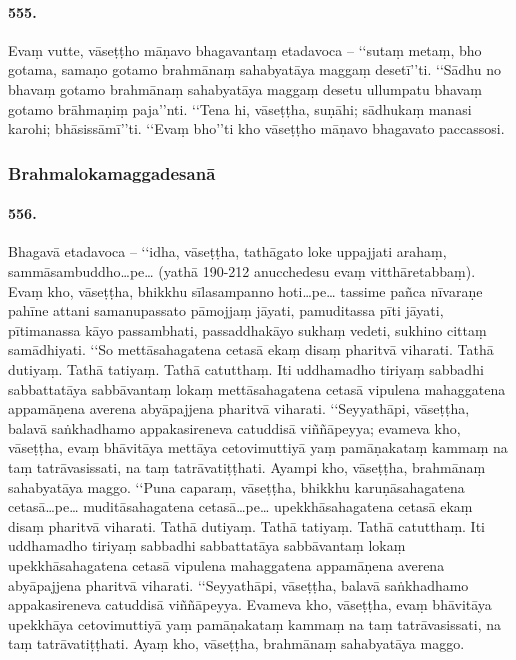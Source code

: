 \paragraph{555.} Evaṃ vutte, vāseṭṭho māṇavo bhagavantaṃ etadavoca – ‘‘sutaṃ metaṃ, bho gotama, samaṇo gotamo brahmānaṃ sahabyatāya maggaṃ desetī’’ti. ‘‘Sādhu no bhavaṃ gotamo brahmānaṃ sahabyatāya maggaṃ desetu ullumpatu bhavaṃ gotamo brāhmaṇiṃ paja’’nti. ‘‘Tena hi, vāseṭṭha, suṇāhi; sādhukaṃ manasi karohi; bhāsissāmī’’ti. ‘‘Evaṃ bho’’ti kho vāseṭṭho māṇavo bhagavato paccassosi.

\subsubsection{Brahmalokamaggadesanā}

\paragraph{556.} Bhagavā etadavoca – ‘‘idha, vāseṭṭha, tathāgato loke uppajjati arahaṃ, sammāsambuddho…pe… (yathā 190-212 anucchedesu evaṃ vitthāretabbaṃ). Evaṃ kho, vāseṭṭha, bhikkhu sīlasampanno hoti…pe… tassime pañca nīvaraṇe pahīne attani samanupassato pāmojjaṃ jāyati, pamuditassa pīti jāyati, pītimanassa kāyo passambhati, passaddhakāyo sukhaṃ vedeti, sukhino cittaṃ samādhiyati. ‘‘So mettāsahagatena cetasā ekaṃ disaṃ pharitvā viharati. Tathā dutiyaṃ. Tathā tatiyaṃ. Tathā catutthaṃ. Iti uddhamadho tiriyaṃ sabbadhi sabbattatāya sabbāvantaṃ lokaṃ mettāsahagatena cetasā vipulena mahaggatena appamāṇena averena abyāpajjena pharitvā viharati. ‘‘Seyyathāpi, vāseṭṭha, balavā saṅkhadhamo appakasireneva catuddisā viññāpeyya; evameva kho, vāseṭṭha, evaṃ bhāvitāya mettāya cetovimuttiyā yaṃ pamāṇakataṃ kammaṃ na taṃ tatrāvasissati, na taṃ tatrāvatiṭṭhati. Ayampi kho, vāseṭṭha, brahmānaṃ sahabyatāya maggo. ‘‘Puna caparaṃ, vāseṭṭha, bhikkhu karuṇāsahagatena cetasā…pe… muditāsahagatena cetasā…pe… upekkhāsahagatena cetasā ekaṃ disaṃ pharitvā viharati. Tathā dutiyaṃ. Tathā tatiyaṃ. Tathā catutthaṃ. Iti uddhamadho tiriyaṃ sabbadhi sabbattatāya sabbāvantaṃ lokaṃ upekkhāsahagatena cetasā vipulena mahaggatena appamāṇena averena abyāpajjena pharitvā viharati. ‘‘Seyyathāpi, vāseṭṭha, balavā saṅkhadhamo appakasireneva catuddisā viññāpeyya. Evameva kho, vāseṭṭha, evaṃ bhāvitāya upekkhāya cetovimuttiyā yaṃ pamāṇakataṃ kammaṃ na taṃ tatrāvasissati, na taṃ tatrāvatiṭṭhati. Ayaṃ kho, vāseṭṭha, brahmānaṃ sahabyatāya maggo.

